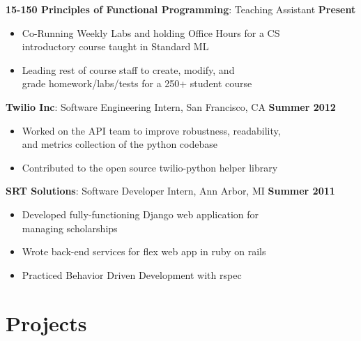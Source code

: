 \documentclass[sectioned]{dsyangres}
\begin{document}
\begin{resume}
\textbf{15-150 Principles of Functional
 Programming}: Teaching Assistant \hfill \textbf{Present}
 \begin{itemize} \itemsep -2pt
   \item Co-Running Weekly Labs and holding Office Hours for a CS\\
     introductory course taught in Standard ML
   \item Leading rest of course staff to create, modify, and\\
     grade homework/labs/tests for a 250+ student course
 \end{itemize}

\textbf{Twilio Inc}: Software Engineering Intern,
 San Francisco, CA \hfill \textbf{Summer 2012}
  \begin{itemize} \itemsep -2pt
    \item Worked on the API team to improve robustness, readability, \\
      and metrics collection of the python codebase
    \item Contributed to the open source twilio-python helper library
  \end{itemize}

\textbf{SRT Solutions}: Software Developer Intern,
  Ann Arbor, MI \hfill \textbf{Summer 2011}
  \begin{itemize} \itemsep -2pt
    \item Developed fully-functioning Django web application for\\
      managing scholarships
    \item Wrote back-end services for flex web app in ruby
      on rails
    \item Practiced Behavior Driven Development with rspec
  \end{itemize}



\section{Projects}


\end{resume}
\end{document}
